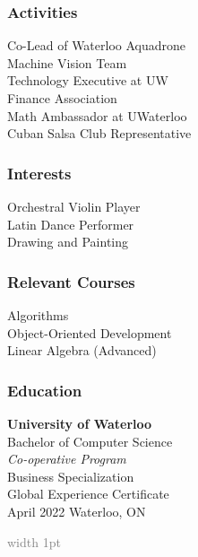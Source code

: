 \documentclass{mxresume}
\begin{document}
\begin{minipage}[t]{0.25\textwidth}
\begin{sidebar}
\subsubsection*{Activities}
Co-Lead of Waterloo Aquadrone \\
Machine Vision Team\\[1mm]
Technology Executive at UW \\
Finance Association \\[1mm]
Math Ambassador at UWaterloo \\[1mm]
Cuban Salsa Club Representative
\subsubsection*{Interests}
Orchestral Violin Player \\[1mm]
Latin Dance Performer \\[1mm]
Drawing and Painting
\subsubsection*{Relevant Courses}
Algorithms \\[1mm]
Object-Oriented Development \\[1mm]
Linear Algebra (Advanced)
\subsubsection*{Education}
\textbf{University of Waterloo} \\[1.2mm]
Bachelor of Computer Science \\
\textit{Co-operative Program} \\[1.2mm]
\tab Business Specialization \\
\tab Global Experience Certificate \\[2mm]
April 2022 \GBar Waterloo, ON
\end{sidebar}
\end{minipage}
%
\hfill\textcolor{gray}{\vline width 1pt}\hfill
%
\end{document}
